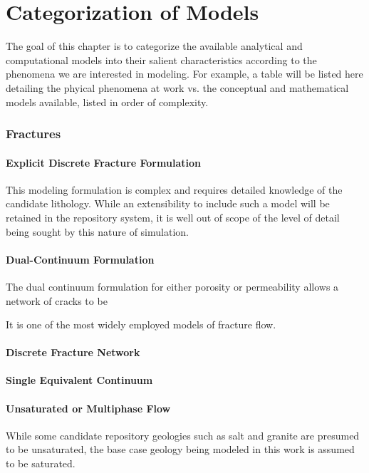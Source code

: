 \chapter{Categorization of Models}\label{ch:categorization}

The goal of this chapter is to categorize the available analytical and 
computational models into their salient characteristics according to the 
phenomena we are interested in modeling. For example, a table will be listed 
here detailing the phyical phenomena at work vs. the conceptual and 
mathematical models available, listed in order of complexity.



\subsection{Fractures}

\subsubsection{Explicit Discrete Fracture Formulation}

This modeling formulation is complex and requires detailed knowledge of the 
candidate lithology. While an extensibility to include such a model will be 
retained in the repository system, it is well out of scope of the level of 
detail being sought by this nature of simulation. 

\subsubsection{Dual-Continuum Formulation}

The dual continuum formulation for either porosity or permeability allows a 
network of cracks to be  

It is one of the most widely employed models of fracture flow. 
\cite{diodato_compendium_1994}

\subsubsection{Discrete Fracture Network}
\subsubsection{Single Equivalent Continuum}
\subsubsection{Unsaturated or Multiphase Flow}
While some candidate repository geologies such as salt and granite are presumed 
to be unsaturated, the base case geology being modeled in this work is assumed 
to be saturated.

